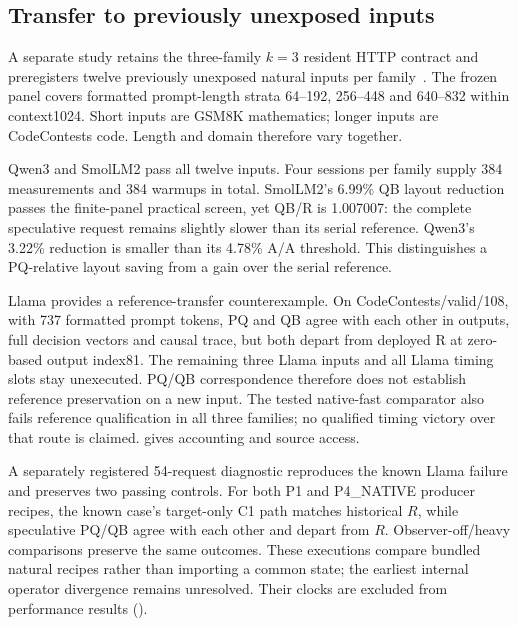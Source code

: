 \subsection{Transfer to previously unexposed inputs}
\label{sec:transfer}
A separate study retains the three-family $k=3$ resident HTTP contract and preregisters twelve previously unexposed natural inputs per family~\cite{rtxtransferrecords}. The frozen panel covers formatted prompt-length strata 64--192, 256--448 and 640--832 within context1024. Short inputs are GSM8K mathematics; longer inputs are CodeContests code. Length and domain therefore vary together.



Qwen3 and SmolLM2 pass all twelve inputs. Four sessions per family supply 384 measurements and 384 warmups in total. SmolLM2's 6.99\% QB layout reduction passes the finite-panel practical screen, yet QB/R is 1.007007: the complete speculative request remains slightly slower than its serial reference. Qwen3's 3.22\% reduction is smaller than its 4.78\% A/A threshold. This distinguishes a PQ-relative layout saving from a gain over the serial reference.

Llama provides a reference-transfer counterexample. On CodeContests/valid/108, with 737 formatted prompt tokens, PQ and QB agree with each other in outputs, full decision vectors and causal trace, but both depart from deployed R at zero-based output index81. The remaining three Llama inputs and all Llama timing slots stay unexecuted. PQ/QB correspondence therefore does not establish reference preservation on a new input. The tested native-fast comparator also fails reference qualification in all three families; no qualified timing victory over that route is claimed.  gives accounting and source access.


A separately registered 54-request diagnostic reproduces the known Llama failure and preserves two passing controls. For both P1 and P4\_NATIVE producer recipes, the known case's target-only C1 path matches historical $R$, while speculative PQ/QB agree with each other and depart from $R$. Observer-off/heavy comparisons preserve the same outcomes. These executions compare bundled natural recipes rather than importing a common state; the earliest internal operator divergence remains unresolved. Their clocks are excluded from performance results ().
